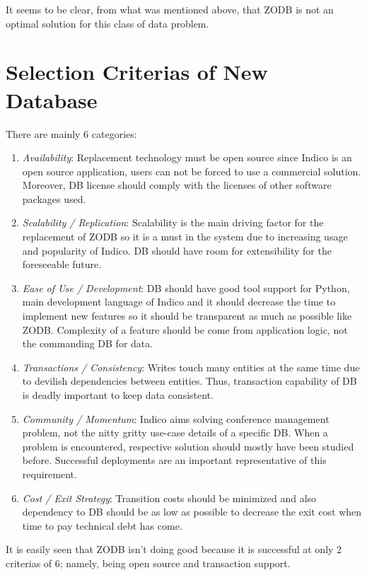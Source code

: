 It seems to be clear, from what was mentioned above, that ZODB is not an optimal solution for this class of data problem.

\section{Selection Criterias of New Database}

There are mainly 6 categories:

\begin{enumerate}
  \item \textit{Availability}: Replacement technology must be open source since Indico is an open source application, users can not be forced to use a commercial solution. Moreover, DB license should comply with the licenses of other software packages used.
  \item \textit{Scalability / Replication}: Scalability is the main driving factor for the replacement of ZODB so it is a must in the system due to increasing usage and popularity of Indico. DB should have room for extensibility for the foreseeable future.
  \item \textit{Ease of Use / Development}: DB should have good tool support for Python, main development language of Indico and it should decrease the time to implement new features so it should be transparent as much as possible like ZODB. Complexity of a feature should be come from application logic, not the commanding DB for data.
  \item \textit{Transactions / Consistency}: Writes touch many entities at the same time due to devilish dependencies between entities. Thus, transaction capability of DB is deadly important to keep data consistent.
  \item \textit{Community / Momentum}: Indico aims solving conference management problem, not the nitty gritty use-case details of a specific DB. When a problem is encountered, respective solution should mostly have been studied before. Successful deployments are an important representative of this requirement.
  \item \textit{Cost / Exit Strategy}: Transition costs should be minimized and also dependency to DB should be as low as possible to decrease the exit cost when time to pay technical debt has come.
\end{enumerate}

It is easily seen that ZODB isn't doing good because it is successful at only 2 criterias of 6; namely, being open source and transaction support.

